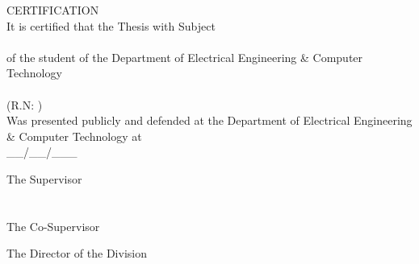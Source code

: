 \pagestyle{empty}
\begin{center}
{\LARGE CERTIFICATION\\[1cm]}
\large It is certified that the Thesis with Subject\\[1cm]
\textbf{\large \doctitle }\\[1cm]
of the student of the Department of Electrical Engineering \& Computer Technology\\[1.5cm]
\me \\[0.5cm]
(R.N: \studnum )\\[1.5cm]
Was presented publicly and defended at the Department of Electrical Engineering \& Computer Technology at\\[1cm]
\Large{\_\_/\_\_/\_\_\_}\\[1.5cm]
\end{center}
\begin{minipage}{0.5\textwidth}
\begin{flushleft} \large
The Supervisor\\[2cm]
\supname \\
\emph{\suptitle}\\[1cm]
The Co-Supervisor\\[2cm]
\cosupname
\emph{\cosuptitle}

\end{flushleft}
\end{minipage}
\begin{minipage}{0.5\textwidth}
\begin{flushright} \large
The Director of the Division\\[4cm]
\headofdivision\\
\emph{\headofdivisiontitle}
\end{flushright}
\end{minipage}
